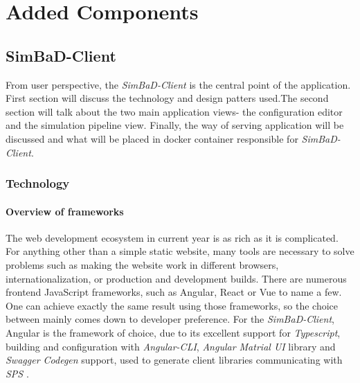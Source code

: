 \chapter{Added Components}
\label{chapter:4}
\section{SimBaD-Client}
From user perspective, the \textit{SimBaD-Client} is the central point of the application. First section will discuss the technology and design patters used.The second section will talk about the two main application views- the configuration editor and the simulation pipeline view. Finally, the way of serving application will be discussed and what will be placed in docker container responsible for \textit{SimBaD-Client}.
\subsection{Technology}
\subsubsection{Overview of frameworks}
The web development ecosystem in current year is as rich as it is complicated. For anything other than a simple static website, many tools are necessary to solve problems such as making the website work in different browsers, internationalization, or production and development builds. There are numerous frontend JavaScript frameworks, such as Angular, React or Vue to name a few. One can achieve exactly the same result using those frameworks, so the choice between mainly comes down to developer preference. For the \textit{SimBaD-Client}, Angular is the framework of choice, due to its excellent support for \textit{Typescript}, building and configuration with \textit{Angular-CLI}, \textit{Angular Matrial UI} library and \textit{Swagger Codegen} support, used to generate client libraries communicating with \textit{SPS} \cite{SwaggerCodegen}.
